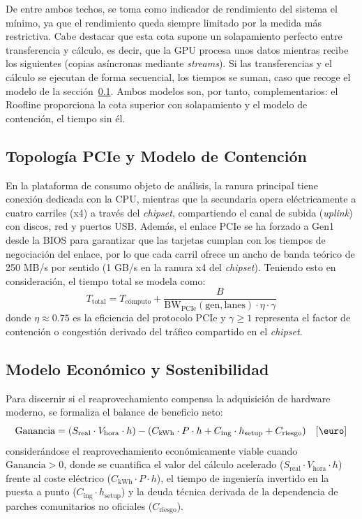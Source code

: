 \documentclass[a4paper,11pt]{article}
\begin{document}
De entre ambos techos, se toma como indicador de rendimiento del sistema el mínimo, ya que el rendimiento queda
siempre limitado por la medida más restrictiva. Cabe destacar que esta cota supone un solapamiento perfecto entre
transferencia y cálculo, es decir, que la GPU procesa unos datos mientras recibe los siguientes (copias asíncronas
mediante \textit{streams}). Si las transferencias y el cálculo se ejecutan de forma secuencial, los tiempos se suman,
caso que recoge el modelo de la sección~\ref{sec:topologia}. Ambos modelos son, por tanto, complementarios: el Roofline
proporciona la cota superior con solapamiento y el modelo de contención, el tiempo sin él.


\subsection{Topología PCIe y Modelo de Contención}\label{sec:topologia}

En la plataforma de consumo objeto de análisis, la ranura principal tiene conexión dedicada con la CPU,
mientras que la secundaria opera eléctricamente a cuatro carriles (x4) a través del \textit{chipset}, compartiendo 
el canal de subida (\textit{uplink}) con discos, red y puertos USB. Además, el enlace PCIe se ha forzado a Gen1 desde la BIOS
para garantizar que las tarjetas cumplan con los tiempos de negociación del enlace, por lo que cada carril ofrece un ancho de banda teórico de 250 MB/s por sentido (1 GB/s en la ranura x4 del \textit{chipset}).
Teniendo esto en consideración,
el tiempo total se modela como:
\[
T_{\text{total}} = T_{\text{cómputo}} + \frac{B}{\text{BW}_{\text{PCIe}}(\text{gen},\text{lanes}) \cdot \eta \cdot \gamma}
\]
donde $\eta \approx 0.75$ es la eficiencia del protocolo PCIe y $\gamma \ge 1$ representa el factor de contención o congestión derivado del tráfico compartido en el \textit{chipset}.

\subsection{Modelo Económico y Sostenibilidad}\label{sec:economia}

Para discernir si el reaprovechamiento compensa la adquisición de hardware moderno, se formaliza el balance de beneficio neto:
\begin{equation}
\text{Ganancia} = (S_{\text{real}} \cdot V_{\text{hora}} \cdot h) - (C_{\text{kWh}} \cdot P \cdot h + C_{\text{ing}} \cdot h_{\text{setup}} + C_{\text{riesgo}}) \quad [\text{\euro}]
\end{equation}
considerándose el reaprovechamiento económicamente viable cuando $\text{Ganancia} > 0$,
donde se cuantifica el valor del cálculo acelerado ($S_{\text{real}} \cdot V_{\text{hora}} \cdot h$) frente al coste eléctrico
($C_{\text{kWh}} \cdot P \cdot h$), el tiempo de ingeniería invertido en la puesta a punto ($C_{\text{ing}} \cdot h_{\text{setup}}$) 
y la deuda técnica derivada de la dependencia de parches comunitarios no oficiales ($C_{\text{riesgo}}$).
\end{document}
